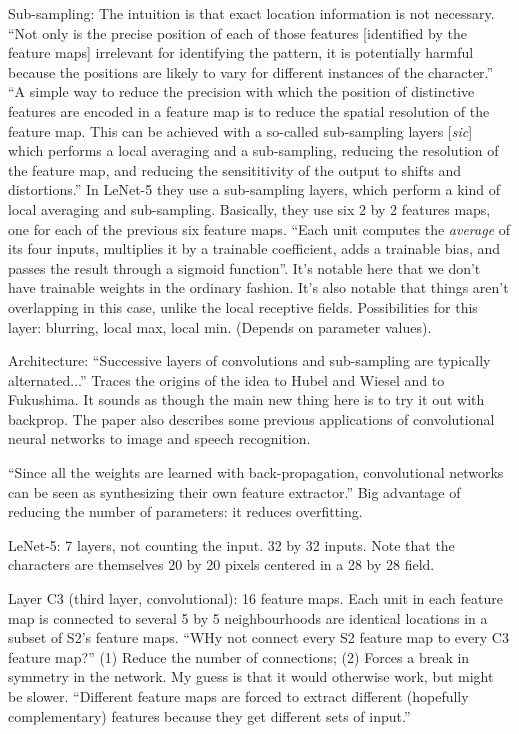 \documentclass[12pt]{report}
\begin{document}
Sub-sampling: The intuition is that exact location information is not
necessary.  ``Not only is the precise position of each of those
features [identified by the feature maps] irrelevant for identifying
the pattern, it is potentially harmful because the positions are
likely to vary for different instances of the character.''  ``A simple
way to reduce the precision with which the position of distinctive
features are encoded in a feature map is to reduce the spatial
resolution of the feature map.  This can be achieved with a so-called
sub-sampling layers [\emph{sic}] which performs a local averaging and
a sub-sampling, reducing the resolution of the feature map, and
reducing the sensititivity of the output to shifts and distortions.''
In LeNet-5 they use a sub-sampling layers, which perform a kind of
local averaging and sub-sampling.  Basically, they use six 2 by 2
features maps, one for each of the previous six feature maps.  ``Each
unit computes the \emph{average} of its four inputs, multiplies it by
a trainable coefficient, adds a trainable bias, and passes the result
through a sigmoid function''.  It's notable here that we don't have
trainable weights in the ordinary fashion.  It's also notable that
things aren't overlapping in this case, unlike the local receptive
fields.  Possibilities for this layer: blurring, local max, local min.
(Depends on parameter values).  

Architecture: ``Successive layers of convolutions and sub-sampling are
typically alternated...''  Traces the origins of the idea to Hubel and
Wiesel and to Fukushima.  It sounds as though the main new thing here
is to try it out with backprop.  The paper also describes some
previous applications of convolutional neural networks to image and
speech recognition.

``Since all the weights are learned with back-propagation,
convolutional networks can be seen as synthesizing their own feature
extractor.''  Big advantage of reducing the number of parameters: it
reduces overfitting.

LeNet-5: 7 layers, not counting the input.  32 by 32 inputs.  Note
that the characters are themselves 20 by 20 pixels centered in a 28 by
28 field.

Layer C3 (third layer, convolutional): 16 feature maps.  Each unit in
each feature map is connected to several 5 by 5 neighbourhoods are
identical locations in a subset of S2's feature maps.  ``WHy not
connect every S2 feature map to every C3 feature map?''  (1) Reduce
the number of connections; (2) Forces a break in symmetry in the
network.  My guess is that it would otherwise work, but might be
slower.  ``Different feature maps are forced to extract different
(hopefully complementary) features because they get different sets of
input.''
\end{document}
